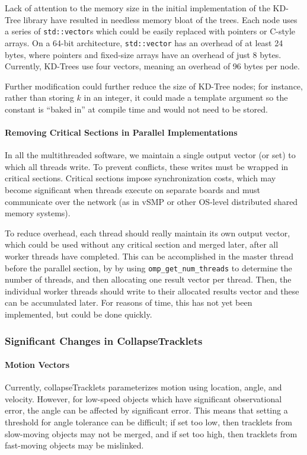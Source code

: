 Lack of attention to the memory size in the initial implementation of
the KD-Tree library have resulted in needless memory bloat of the
trees.  Each node uses a series of \texttt{std::vector}s which could
be easily replaced with pointers or C-style arrays.  On a 64-bit
architecture, \texttt{std::vector} has an overhead of at least 24
bytes, where pointers and fixed-size arrays have an overhead of just 8
bytes.  Currently, KD-Trees use four vectors, meaning an overhead of
96 bytes per node.

Further modification could further reduce the size of KD-Tree nodes;
for instance, rather than storing $k$ in an integer, it could made a
template argument so the constant is ``baked in'' at compile time and
would not need to be stored.  

\paragraph{Removing Critical Sections in Parallel Implementations}
In all the multithreaded software, we maintain a single output vector
(or set) to which all threads write.  To prevent conflicts, these
writes must be wrapped in critical sections.  Critical sections impose
synchronization costs, which may become significant when threads
execute on separate boards and must communicate over the network (as
in vSMP or other OS-level distributed shared memory systems).

To reduce overhead, each thread should really maintain its own output
vector, which could be used without any critical section and merged
later, after all worker threads have completed.  This can be
accomplished in the master thread before the parallel section, by by
using \texttt{omp\_get\_num\_threads} to determine the number of
threads, and then allocating one result vector per thread.  Then, the
individual worker threads should write to their allocated results
vector and these can be accumulated later.  For reasons of time, this
has not yet been implemented, but could be done quickly.

\subsubsection{Significant Changes in CollapseTracklets}
\paragraph{Motion Vectors} 
Currently, collapseTracklets parameterizes motion using location,
angle, and velocity.  However, for low-speed objects which have
significant observational error, the angle can be affected by
significant error.  This means that setting a threshold for angle
tolerance can be difficult; if set too low, then tracklets from
slow-moving objects may not be merged, and if set too high, then
tracklets from fast-moving objects may be mislinked.

